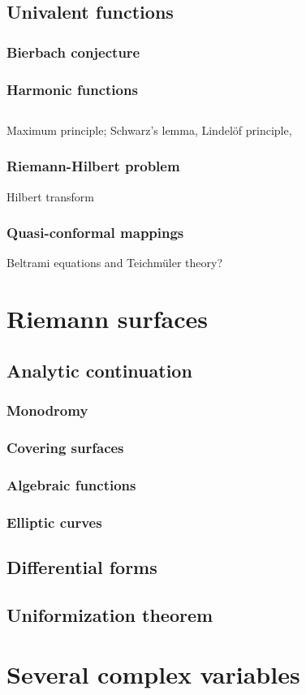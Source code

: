 \documentclass{../note}
\begin{document}
\chapter{Univalent functions}
\section{Bierbach conjecture}
\section{Harmonic functions}




\chapter{}

Maximum principle; Schwarz's lemma, Lindelöf principle,

\section{Riemann-Hilbert problem}
Hilbert transform

\section{Quasi-conformal mappings}
Beltrami equations and Teichm\"uler theory?





\part{Riemann surfaces}

\chapter{Analytic continuation}
\section{Monodromy}
\section{Covering surfaces}
\section{Algebraic functions}
\section{Elliptic curves}

\chapter{Differential forms}

\chapter{Uniformization theorem}




\part{Several complex variables}
\end{document}
